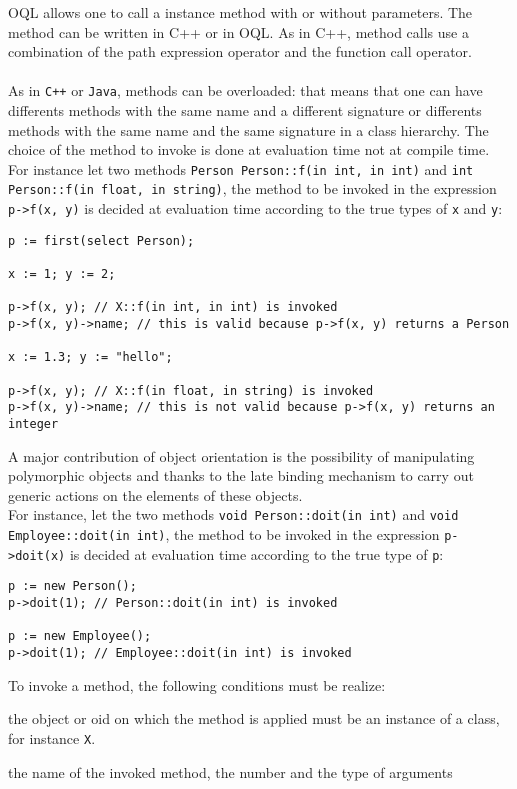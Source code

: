 OQL allows one to call a instance method with or without parameters.
The method can be written in C++ or in OQL.
As in C++, method calls use a combination of the path expression operator and
the function call operator.\\\\
As in \texttt{C++} or \texttt{Java}, methods can be overloaded: that
means that one can have differents methods with the same name and a
different signature or differents methods with the same name
and the same signature in a class hierarchy.
The choice of the method to invoke
is done at evaluation time not at compile time.
For instance let two
methods \texttt{Person Person::f(in int, in int)} and \texttt{int Person::f(in float, in string)},
the method to be invoked in the expression \texttt{p->f(x, y)} is decided
at evaluation time according to the true types of \texttt{x} and \texttt{y}:
\verbsize
\begin{verbatim}
p := first(select Person);

x := 1; y := 2;

p->f(x, y); // X::f(in int, in int) is invoked
p->f(x, y)->name; // this is valid because p->f(x, y) returns a Person

x := 1.3; y := "hello";

p->f(x, y); // X::f(in float, in string) is invoked
p->f(x, y)->name; // this is not valid because p->f(x, y) returns an integer
\end{verbatim}
\normalsize
A major contribution of object orientation is the possibility of manipulating
polymorphic objects and thanks to the late binding mechanism
to carry out generic actions on the elements of these objects.\\
For instance, let the two
methods \texttt{void Person::doit(in int)}
and \texttt{void Employee::doit(in int)},
the method to be invoked in the expression \texttt{p->doit(x)} is decided
at evaluation time according to the true type of \texttt{p}:
\verbsize
\begin{verbatim}
p := new Person();
p->doit(1); // Person::doit(in int) is invoked

p := new Employee();
p->doit(1); // Employee::doit(in int) is invoked
\end{verbatim}
\normalsize
To invoke a method, the following conditions must be realize:
\be
\item the object or oid on which the method is applied must be
an instance of a class, for instance \texttt{X}.
\item the name of the invoked method, the number and the type of arguments
